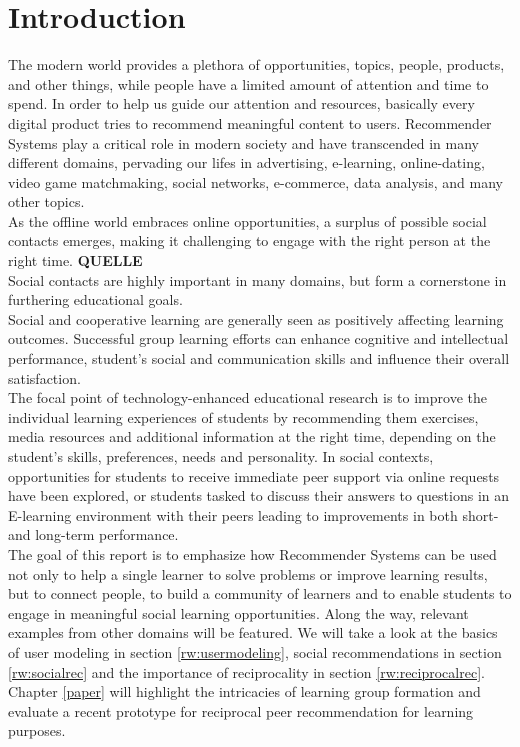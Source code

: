 \documentclass[nochapterpage,bigchapter,linedtoc,longdoc,colorback,accentcolor=tud3b,oneside]{tudreport}
\begin{document}
\chapter{Introduction}
The modern world provides a plethora of opportunities, topics, people, products, and other things, while people have a limited amount of attention and time to spend. In order to help us guide our attention and resources, basically every digital product tries to recommend meaningful content to users. Recommender Systems play a critical role in modern society and have transcended in many different domains, pervading our lifes in advertising, e-learning, online-dating, video game matchmaking, social networks, e-commerce, data analysis, and many other topics.\\
As the offline world embraces online opportunities, a surplus of possible social contacts emerges, making it challenging to engage with the right person at the right time. \textbf{QUELLE}\\
Social contacts are highly important in many domains, but form a cornerstone in furthering educational goals.\\
Social and cooperative learning are generally seen as positively affecting learning outcomes. \cite{bossert1982instructional, blumenfeld1996learning} Successful group learning efforts can enhance cognitive and intellectual performance, student's social and communication skills and influence their overall satisfaction. \cite{zhao2004adding, maxwell2008learning}\\
The focal point of technology-enhanced educational research is to improve the individual learning experiences of students by recommending them exercises, media resources and additional information at the right time, depending on the student's skills, preferences, needs and personality. \cite{drachsler2015panorama, erdt2015evaluating} In social contexts, opportunities for students to receive immediate peer support via online requests have been explored, \cite{greer1998intelligent} or students tasked to discuss their answers to questions in an E-learning environment with their peers leading to improvements in both short- and long-term performance. \cite{reidsema2016exploring}\\
The goal of this report is to emphasize how Recommender Systems can be used not only to help a single learner to solve problems or improve learning results, but to connect people, to build a community of learners and to enable students to engage in meaningful social learning opportunities. Along the way, relevant examples from other domains will be featured. We will take a look at the basics of user modeling in section \ref{rw:usermodeling}, social recommendations in section \ref{rw:socialrec} and the importance of reciprocality in section \ref{rw:reciprocalrec}. Chapter \ref{paper} will highlight the intricacies of learning group formation and evaluate a recent prototype for reciprocal peer recommendation for learning purposes.\\
\end{document}
